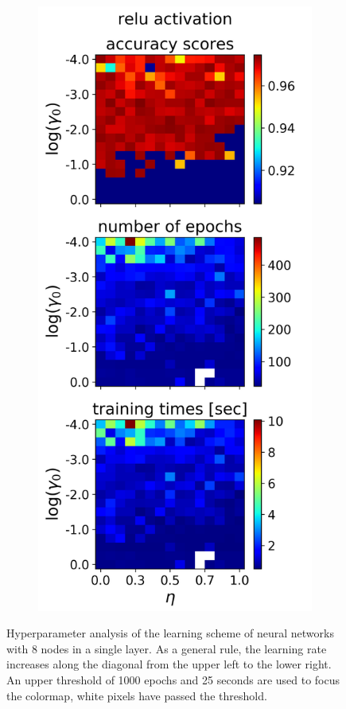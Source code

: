 \documentclass[nofootinbib,reprint,english]{revtex4-1}
\begin{document}
\begin{figure}[h!]
\begin{subfigure}{0.32\textwidth}
	\end{subfigure}
	~
	\begin{subfigure}{0.32\textwidth}
	\centering
	\includegraphics[scale=0.38]{../results/NN/img/gridsearch2_relu1.png}
	\end{subfigure}	
\caption{Hyperparameter analysis of the learning scheme of neural networks with 8 nodes in a single layer. As a general rule, the learning rate increases along the diagonal from the upper left to the lower right. An upper threshold of 1000 epochs and 25 seconds are used to focus the colormap, white pixels have passed the threshold.}
\label{fig:NNgridsearch2_1}
\end{figure}
\end{document}
